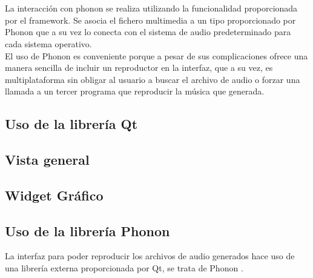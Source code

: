{\newline
\\
\\La interacción con phonon se realiza utilizando la funcionalidad proporcionada por el framework. Se asocia el fichero multimedia a un tipo proporcionado por Phonon que a su vez lo conecta con el sistema de audio predeterminado para cada sistema operativo.
\\El uso de Phonon es conveniente porque a pesar de sus complicaciones ofrece una manera sencilla de incluir un reproductor en la interfaz, que a su vez, es multiplataforma sin obligar al usuario a buscar el archivo de audio o forzar una llamada a un tercer programa que reproducir la música que generada.

\subsection{Uso de la librería Qt}


\subsection{Vista general}


\subsection{Widget Gráfico}


\subsection{Uso de la librería Phonon}


La interfaz para poder reproducir los archivos de audio generados hace uso de una librería externa proporcionada por Qt, se trata de Phonon \cite{phononOverview}. }